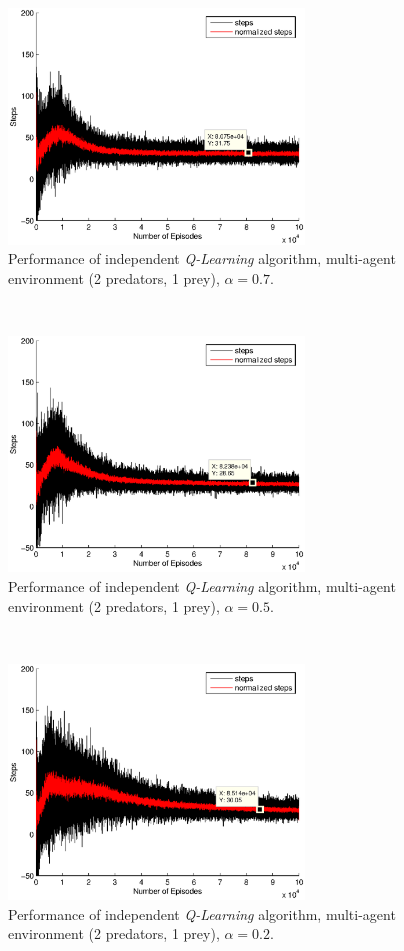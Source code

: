 \documentclass[a4paper,11pt]{article}
\begin{document}
\begin{figure}[ht!]
  \centering
    \includegraphics[width=0.7\textwidth]{figures/q207.eps}
    \caption{Performance of independent \textit{Q-Learning} algorithm, multi-agent environment (2 predators, 1 prey), $\alpha = 0.7$.}
    \label{q21}
\end{figure}
~
\begin{figure}[ht!]
  \centering
	\includegraphics[width=0.7\textwidth]{figures/q205.eps}
   \caption{Performance of independent \textit{Q-Learning} algorithm, multi-agent environment (2 predators, 1 prey), $\alpha = 0.5$.}
    \label{q22}
\end{figure}
~
\begin{figure}[ht!]
  \centering
	\includegraphics[width=0.7\textwidth]{figures/q202.eps}
    \caption{Performance of independent \textit{Q-Learning} algorithm, multi-agent environment (2 predators, 1 prey), $\alpha = 0.2$.}
    \label{q23}
\end{figure}
\end{document}
